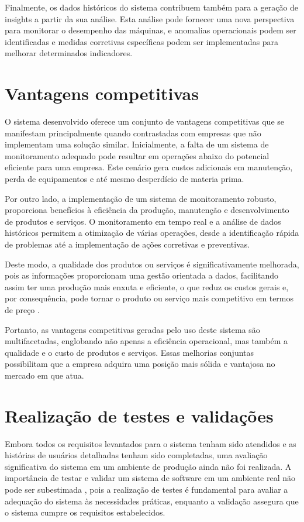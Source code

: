 Finalmente, os dados históricos do sistema contribuem também para a geração de insights a partir da sua análise. Esta análise pode fornecer uma nova perspectiva para monitorar o desempenho das máquinas, e anomalias operacionais podem ser identificadas e medidas corretivas específicas podem ser implementadas para melhorar determinados indicadores.

\section{Vantagens competitivas}\label{sec:competitive}
O sistema desenvolvido oferece um conjunto de vantagens competitivas que se manifestam principalmente quando contrastadas com empresas que não implementam uma solução similar. Inicialmente, a falta de um sistema de monitoramento adequado pode resultar em operações abaixo do potencial eficiente para uma empresa. Este cenário gera custos adicionais em manutenção, perda de equipamentos e até mesmo desperdício de materia prima.

Por outro lado, a implementação de um sistema de monitoramento robusto, proporciona benefícios à eficiência da produção, manutenção e desenvolvimento de produtos e serviços. O monitoramento em tempo real e a análise de dados históricos permitem a otimização de várias operações, desde a identificação rápida de problemas até a implementação de ações corretivas e preventivas. 

Deste modo, a qualidade dos produtos ou serviços é significativamente melhorada, pois as informações proporcionam uma gestão orientada a dados, facilitando assim ter uma produção mais enxuta e eficiente, o que reduz os custos gerais e, por consequência, pode tornar o produto ou serviço mais competitivo em termos de preço \cite{glowalla2014processDriven}.

Portanto, as vantagens competitivas geradas pelo uso deste sistema são multifacetadas, englobando não apenas a eficiência operacional, mas também a qualidade e o custo de produtos e serviços. Essas melhorias conjuntas possibilitam que a empresa adquira uma posição mais sólida e vantajosa no mercado em que atua.

\section{Realização de testes e validações}\label{sec:tests}
Embora todos os requisitos levantados para o sistema tenham sido atendidos e as histórias de usuários detalhadas tenham sido completadas, uma avaliação significativa do sistema em um ambiente de produção ainda não foi realizada. A importância de testar e validar um sistema de software em um ambiente real não pode ser subestimada \cite{leTraon1999selfTestable}, pois a realização de testes é fundamental para avaliar a adequação do sistema às necessidades práticas, enquanto a validação assegura que o sistema cumpre os requisitos estabelecidos. 

